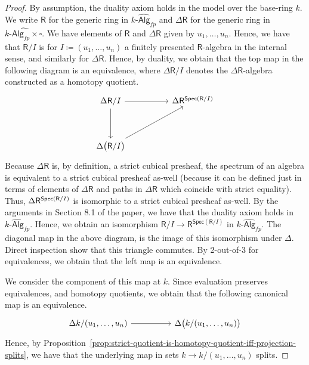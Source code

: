 \documentclass[10pt,a4paper]{article}
\DeclarePairedDelimiter\paren{(}{)}
\newcommand\R{\mathsf{R}}
\newcommand\Spec{\mathsf{Spec}}
\begin{document}
\begin{proof}
  By assumption, the duality axiom holds in the model over the base-ring $k$.
  We write $\R$ for the generic ring in $\widehat{k\textsf{-Alg}_{fp}}$ and $\Delta\R$ for the generic ring in $\widehat{k\textsf{-Alg}_{fp} \times \square}$.
  We have elements of $\R$ and $\Delta \R$ given by $u_1, \ldots, u_n$.
  Hence, we have that $\R/I$ is for $I \coloneqq (u_1, \ldots, u_n)$ a finitely presented $\R$-algebra in the internal sense, and similarly for $\Delta \R$.
  Hence, by duality, we obtain that the top map in the following diagram is an equivalence, where $\Delta \R/I$ denotes the $\Delta\R$-algebra constructed as a homotopy quotient.
  \[\begin{tikzcd}
    \Delta\R/I \arrow[dd] \arrow[rr]                &  & \Delta\R^{\Spec\paren{\R/I}} \\
                                                   &  &                                  \\
    \Delta\paren[\big]{\R/I} \arrow[rruu] &  &                                 
  \end{tikzcd}\]
  Because $\Delta\R$ is, by definition, a strict cubical presheaf, the spectrum of an algebra is equivalent to a strict cubical presheaf as-well (because it can be defined just in terms of elements of $\Delta \R$ and paths in $\Delta \R$ which coincide with strict equality).
  Thus, $\Delta\R^{\Spec\paren{\R/I}}$ is isomorphic to a strict cubical presheaf as-well.
  By the arguments in Section 8.1 of the paper, we have that the duality axiom holds in $\widehat{k\textsf{-Alg}_{fp}}$.
  Hence, we obtain an isomorphism $\R/I \to \R^{\Spec(\R / I)}$ in $\widehat{k\textsf{-Alg}_{fp}}$.
  The diagonal map in the above diagram, is the image of this isomorphism under \(\Delta\).
  Direct inspection show that this triangle commutes.
  By 2-out-of-3 for equivalences, we obtain that the left map is an equivalence.

  We consider the component of this map at $k$.
  Since evaluation preserves equivalences, and homotopy quotients, we obtain that the following canonical map is an equivalence.
  \[\begin{tikzcd}
    \Delta k/(u_1, \ldots, u_n) \arrow[rr] & & \Delta\paren[\big]{k/(u_1, \ldots, u_n)}                            
  \end{tikzcd}\]
  Hence, by Proposition~\ref{prop:strict-quotient-is-homotopy-quotient-iff-projection-splits}, we have that the underlying map in sets $k \to k/(u_1, \ldots, u_n)$ splits. 
\end{proof}
\end{document}

